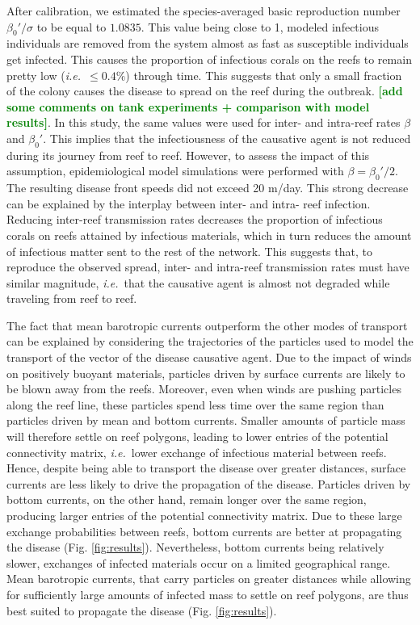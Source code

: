 \documentclass[utf8]{frontiersSCNS}
\newcommand{\ie}{{\it i.e.}\ }
\newcommand{\erinn}[1]{\textbf{\textcolor{green}{#1}}}
\newcommand{\dobby}[1]{\textbf{\color{violet}{#1}}}
\begin{document}
After calibration, we estimated the species-averaged basic reproduction number $\beta_0'/\sigma$ to be equal to $1.0835$. This value being close to 1, modeled infectious individuals are removed from the system almost as fast as susceptible individuals get infected. This causes the proportion of infectious corals on the reefs to remain pretty low (\ie $\leq 0.4\%$) through time. This suggests that only a small fraction of the colony causes the disease to spread on the reef during the outbreak. \erinn{[add some comments on tank experiments + comparison with model results]}. In this study, the same values were used for inter- and intra-reef rates $\beta$ and $\beta_0'$. This implies that the infectiousness of the causative agent is not reduced during its journey from reef to reef. However, to assess the impact of this assumption, epidemiological model simulations were performed with $\beta=\beta_0'/2$. The resulting disease front speeds did not exceed 20 m/day. This strong decrease can be explained by the interplay between inter- and intra- reef infection. Reducing inter-reef transmission rates decreases the proportion of infectious corals on reefs attained by infectious materials, which in turn reduces the amount of infectious matter sent to the rest of the network. This suggests that, to reproduce the observed spread, inter- and intra-reef transmission rates must have similar magnitude, \ie that the causative agent is almost not degraded while traveling from reef to reef. \dobby{Is this consistent with Rhodobacterales and Rhizobiales ?}


The fact that mean barotropic currents outperform the other modes of transport can be explained by considering the trajectories of the particles used to model the transport of the vector of the disease causative agent. Due to the impact of winds on positively buoyant materials, particles driven by surface currents are likely to be blown away from the reefs. Moreover, even when winds are pushing particles along the reef line, these particles spend less time over the same region than particles driven by mean and bottom currents. Smaller amounts of particle mass will therefore settle on reef polygons, leading to lower entries of the potential connectivity matrix, \ie lower exchange of infectious material between reefs. Hence, despite being able to transport the disease over greater distances, surface currents are less likely to drive the propagation of the disease. Particles driven by bottom currents, on the other hand, remain longer over the same region, producing larger entries of the potential connectivity matrix. Due to these large exchange probabilities between reefs, bottom currents are better at propagating the disease (Fig. \ref{fig:results}). Nevertheless, bottom currents being relatively slower, exchanges of infected materials occur on a limited geographical range. Mean barotropic currents, that carry particles on greater distances while allowing for sufficiently large amounts of infected mass to settle on reef polygons, are thus best suited to propagate the disease (Fig. \ref{fig:results}).
\end{document}
